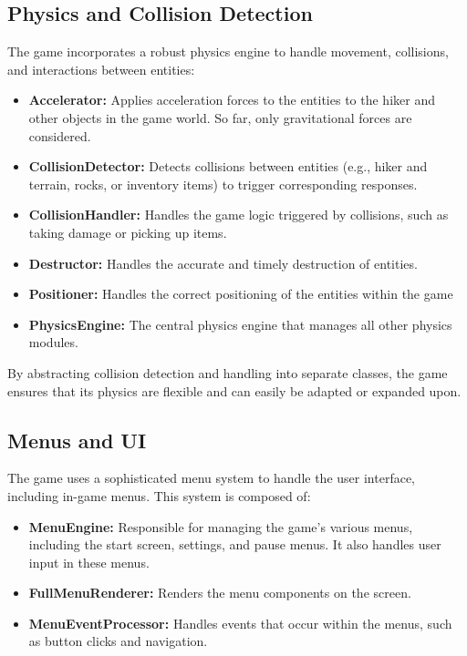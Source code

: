 \subsection{Physics and Collision Detection}

The game incorporates a robust physics engine to handle movement, collisions, and interactions between entities:

\begin{itemize}
    \item \textbf{Accelerator:} Applies acceleration forces to the entities to the hiker and other objects in the game world. So far, only gravitational forces are considered.
    \item \textbf{CollisionDetector:} Detects collisions between entities (e.g., hiker and terrain, rocks, or inventory items) to trigger corresponding responses.
    \item \textbf{CollisionHandler:} Handles the game logic triggered by collisions, such as taking damage or picking up items.
    \item \textbf{Destructor:} Handles the accurate and timely destruction of entities.
    \item \textbf{Positioner:} Handles the correct positioning of the entities within the game
    \item \textbf{PhysicsEngine:} The central physics engine that manages all other physics modules.
\end{itemize}
By abstracting collision detection and handling into separate classes, the game ensures that its physics are flexible and can easily be adapted or expanded upon.

\subsection{Menus and UI}

The game uses a sophisticated menu system to handle the user interface, including in-game menus. This system is composed of:

\begin{itemize}
    \item \textbf{MenuEngine:} Responsible for managing the game's various menus, including the start screen, settings, and pause menus. It also handles user input in these menus.
    \item \textbf{FullMenuRenderer:} Renders the menu components on the screen.
    \item \textbf{MenuEventProcessor:} Handles events that occur within the menus, such as button clicks and navigation.
\end{itemize}

